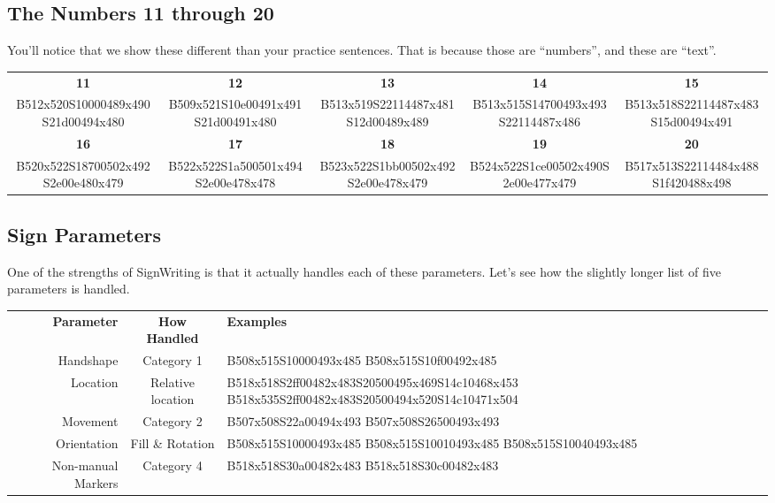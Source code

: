 \documentclass{article}
\begin{document}
\subsection{The Numbers 11 through 20}

You'll notice that we show these different than your practice sentences.
That is because those are ``numbers'', and these are ``text''.

\begin{center}
\begin{tabular}{*{5}{c}}
\textbf{11}&\textbf{12}&\textbf{13}&\textbf{14}&\textbf{15}\\
B512x520S10000489x490S21d00494x480&
B509x521S10e00491x491S21d00491x480&
B513x519S22114487x481S12d00489x489&
B513x515S14700493x493S22114487x486&
B513x518S22114487x483S15d00494x491\\
\textbf{16}&\textbf{17}&\textbf{18}&\textbf{19}&\textbf{20}\\
B520x522S18700502x492S2e00e480x479&
B522x522S1a500501x494S2e00e478x478&
B523x522S1bb00502x492S2e00e478x479&
B524x522S1ce00502x490S2e00e477x479&
B517x513S22114484x488S1f420488x498\\
\end{tabular}
\end{center}

\subsection{Sign Parameters}

One of the strengths of SignWriting is that it actually handles each of these parameters.
Let's see how the slightly longer list of five parameters is handled.

\begin{center}
\begin{tabular}{rcl}
\textbf{Parameter}&\textbf{How Handled}&\textbf{Examples}\\
Handshape         &Category 1       &B508x515S10000493x485 B508x515S10f00492x485\\
Location          &Relative location&B518x518S2ff00482x483S20500495x469S14c10468x453 B518x535S2ff00482x483S20500494x520S14c10471x504\\
Movement          &Category 2       &B507x508S22a00494x493 B507x508S26500493x493\\
Orientation       &Fill \& Rotation &B508x515S10000493x485 B508x515S10010493x485 B508x515S10040493x485\\
Non-manual Markers&Category 4       &B518x518S30a00482x483 B518x518S30c00482x483\\
\end{tabular}
\end{center}
\end{document}
